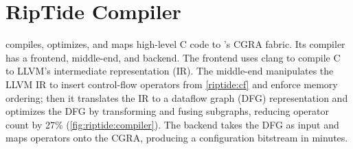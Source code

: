 \newcommand{\pes}{PEs\xspace}
\newcommand{\fend}{frontend\xspace}
\newcommand{\mend}{middle-end\xspace}
\newcommand{\bend}{backend\xspace}

\section{RipTide Compiler}
\label{riptide:compiler}

\riptide compiles, optimizes, and maps high-level C code to \riptide's CGRA fabric. 
%
%
%
%
%
Its compiler has a \fend, \mend, and \bend.
%
The \fend uses clang to compile C to LLVM's intermediate representation (IR).
%
% 
The \mend manipulates the LLVM IR to insert control-flow operators from  \autoref{riptide:cf} and enforce memory ordering; then it translates the IR to a dataflow graph (DFG) representation and optimizes the DFG by transforming and fusing subgraphs, reducing operator count by 27\%
(\autoref{fig:riptide:compiler}).
%
%
%
%
The \bend takes the DFG as input and maps operators onto the CGRA,
producing a configuration bitstream in minutes.
%
%

